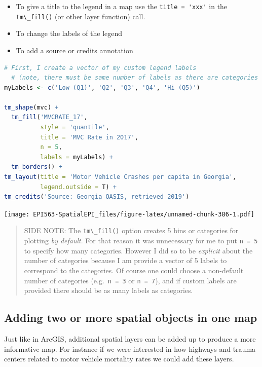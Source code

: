 \documentclass[
]{book}
\newcommand{\passthrough}[1]{#1}
\providecommand{\tightlist}{%
  \setlength{\itemsep}{0pt}\setlength{\parskip}{0pt}}
\begin{document}
\begin{itemize}
\tightlist
\item
  To give a title to the legend in a map use the \passthrough{\lstinline!title = 'xxx'!} in the \passthrough{\lstinline!tm\_fill()!} (or other layer function) call.
\item
  To change the labels of the legend
\item
  To add a source or credits annotation
\end{itemize}

\begin{lstlisting}[language=R]
  # First, I create a vector of my custom legend labels
  # (note, there must be same number of labels as there are categories in map)
myLabels <- c('Low (Q1)', 'Q2', 'Q3', 'Q4', 'Hi (Q5)')

tm_shape(mvc) +
  tm_fill('MVCRATE_17',
          style = 'quantile',
          title = 'MVC Rate in 2017',
          n = 5, 
          labels = myLabels) +
  tm_borders() +
tm_layout(title = 'Motor Vehicle Crashes per capita in Georgia',
          legend.outside = T) +
tm_credits('Source: Georgia OASIS, retrieved 2019')
\end{lstlisting}

\texttt{[image: EPI563-SpatialEPI\_files/figure-latex/unnamed-chunk-386-1.pdf]}

\begin{quote}
SIDE NOTE: The \passthrough{\lstinline!tm\_fill()!} option creates 5 bins or categories for plotting \emph{by default}. For that reason it was unnecessary for me to put \passthrough{\lstinline!n = 5!} to specify how many categories. However I did so to be \emph{explicit} about the number of categories because I am provide a vector of 5 labels to correspond to the categories. Of course one could choose a non-default number of categories (e.g.~\passthrough{\lstinline!n = 3!} or \passthrough{\lstinline!n = 7!}), and if custom labels are provided there should be as many labels as categories.
\end{quote}

\hypertarget{adding-two-or-more-spatial-objects-in-one-map}{%
\subsection{Adding two or more spatial objects in one map}\label{adding-two-or-more-spatial-objects-in-one-map}}

Just like in ArcGIS, additional spatial layers can be added up to produce a more informative map. For instance if we were interested in how highways and trauma centers related to motor vehicle mortality rates we could add these layers.
\end{document}
